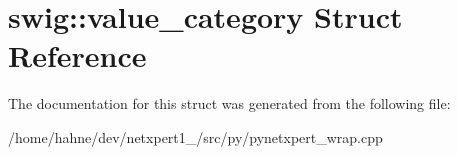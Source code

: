 \hypertarget{structswig_1_1value__category}{}\section{swig\+:\+:value\+\_\+category Struct Reference}
\label{structswig_1_1value__category}


The documentation for this struct was generated from the following file\+:\begin{DoxyCompactItemize}
\item 
/home/hahne/dev/netxpert1\+\_/src/py/pynetxpert\+\_\+wrap.\+cpp\end{DoxyCompactItemize}
